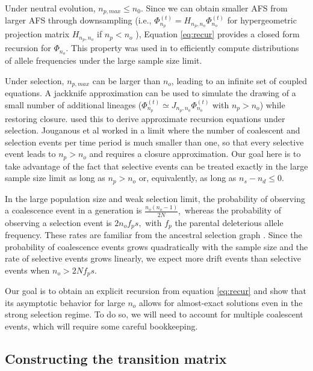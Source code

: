 \documentclass[review]{elsarticle}
\newcommand{\afs}[2]{\Phi_{#1}^{(#2)}}
\begin{document}
Under neutral evolution, $n_{p,max}\leq n_0$. Since we can obtain smaller AFS from larger AFS through downsampling (i.e., $\afs{n_p}{t}  = H_{n_p,n_o} \afs{n_o}{t}$ for hypergeometric projection matrix $H_{n_p,n_o}$ if $n_p<n_o$ ), Equation \eqref{eq:recur} provides a closed form recursion for $\Phi_{n_o}.$ This property was used in \cite{JouganousEtAl2017} to efficiently compute distributions of allele frequencies under the large sample size limit.  

Under selection, $n_{p,max}$ can be larger than $n_o$, leading to an infinite set of coupled equations. A jackknife approximation can be used to simulate the drawing of a small number of additional lineages ($\afs{n_p}{t}  \simeq J_{n_p,n_o} \afs{n_o}{t}$ with $n_p>n_o$) while restoring closure.
\cite{JouganousEtAl2017} used this to derive approximate recursion equations under selection. Jouganous et al worked in a limit where the number of coalescent and selection events per time period is much smaller than one, so that every selective event leads to $n_p> n_o$ and requires a closure approximation.  
Our goal here is to take advantage of the fact that selective events can be treated exactly in the large sample size limit as long as  $n_p > n_o$ or,  equivalently, as long as  $n_s - n_d \leq 0.$
 
 

In the large population size and weak selection limit, the probability of observing a coalescence event 
in a generation is $\frac{n_o(n_o-1)}{2 N},$ whereas the probability of observing a selection event is
$2 n_o f_p s,$ with $f_p$ the parental deleterious allele frequency. These rates are familiar from the 
ancestral selection graph  \citep{KroneNeuhauser1997}. 
Since the probability of coalescence events grows quadratically with the sample size and the 
rate of selective events grows linearly, we expect  more drift events than selective events when 
$n_o>2Nf_p s.$ 


Our goal is to obtain an explicit recursion from equation \eqref{eq:recur} and show that its asymptotic
 behavior for large $n_o$ allows for almost-exact solutions even in the strong selection regime. 
 To do so, we will need to account for multiple coalescent events, which will require some careful bookkeeping.



\subsection{Constructing the transition matrix}
\end{document}
